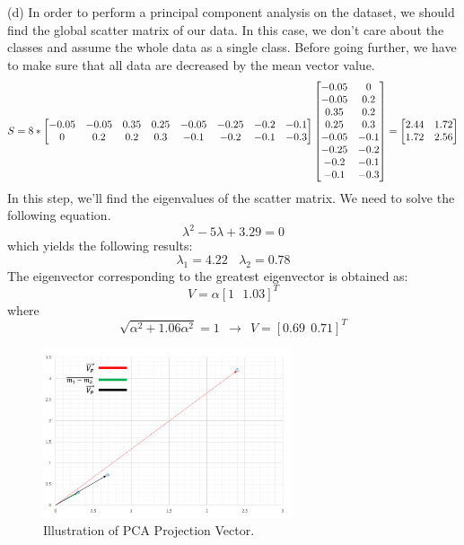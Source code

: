 \documentclass[12pt]{article}
\numberwithin{equation}{section}
\numberwithin{table}{section}
\numberwithin{figure}{section}
\begin{document}
(d) In order to perform a principal component analysis on the dataset, we should find the global scatter matrix of our data. In this case, we don't care about the classes and assume the whole data as a single class. Before going further, we have to make sure that all data are decreased by the mean vector value.
$$
	S = 8 *	\renewcommand\arraystretch{1}
	\begin{bmatrix}
	-0.05 & -0.05 & 0.35 & 0.25 & -0.05 & -0.25 & -0.2 & -0.1 \\
	0 & 0.2 & 0.2 & 0.3 & -0.1 & -0.2 & -0.1 & -0.3 \\
	\end{bmatrix} 	\begin{bmatrix}
	-0.05 & 0\\
	-0.05 & 0.2\\
	0.35 & 0.2\\
	0.25 & 0.3\\
	-0.05 & -0.1\\
	-0.25 & -0.2\\
	-0.2 & -0.1\\
	-0.1 & -0.3\\
	\end{bmatrix} = \begin{bmatrix}
	 2.44 & 1.72\\
	 1.72 & 2.56\\
	\end{bmatrix}
$$
In this step, we'll find the eigenvalues of the scatter matrix. We need to solve the following equation.
$$
	\lambda^2 - 5\lambda + 3.29 = 0
$$
which yields the following results:
$$
	\lambda_1 =  4.22 \ \ \ \ \lambda_2 = 0.78
$$
The eigenvector corresponding to the greatest eigenvector is obtained as:
$$
	V = \alpha[1\ \ \ 1.03]^T
$$
where
$$
	\sqrt{\alpha^2 + 1.06\alpha^2} = 1 \ \ \rightarrow \ \ V = [0.69 \ \ 0.71]^T
$$
		\begin{figure}[!h]\centering
	\includegraphics[width=0.65\textwidth]{2_d.PNG}
	\caption{Illustration of PCA Projection Vector.}
	\label{pl1}
\end{figure}
\end{document}
